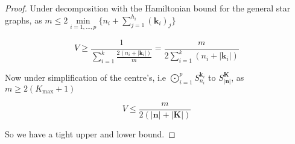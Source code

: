 \documentclass[a4paper,10pt]{article}
\theoremstyle{definition}
\theoremstyle{definition}
\theoremstyle{remark}
\theoremstyle{definition}
\begin{document}
\begin{proof}
Under decomposition with the Hamiltonian bound for the general star graphs, as $m \leq 2 \min\limits_{i=1,...,p} \{n_{i}+\sum\limits_{j=1}^{h_{i}} (\bm{k}_{i})_{j} \}$
 
$$V \geq \frac{1}{\sum\limits_{i=1}^{k} \frac{2(n_{i}+|\bm{k}_{i}|)}{m}}=\frac{m}{2 \sum\limits_{i=1}^{k} (n_{i}+|\bm{k}_{i}|)}$$

Now under simplification of the centre's, i.e $\bigodot\limits_{i=1}^{p} S_{n_{i}}^{\bm{k}_{i}}$ to $S_{|\bm{n}|}^{\bm{K}}$, as $m \geq 2(K_{\text{max}}+1)$

$$V \leq \frac{m}{2( |\bm{n}| + |\bm{K}|)}$$

So we have a tight upper and lower bound.
\end{proof}
\end{document}
